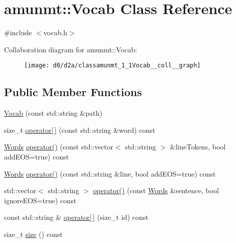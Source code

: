 \hypertarget{classamunmt_1_1Vocab}{}\section{amunmt\+:\+:Vocab Class Reference}
\label{classamunmt_1_1Vocab}


{\ttfamily \#include $<$vocab.\+h$>$}



Collaboration diagram for amunmt\+:\+:Vocab\+:
\nopagebreak
\begin{figure}[H]
\begin{center}
\leavevmode
\texttt{[image: d0/d2a/classamunmt\_1\_1Vocab\_\_coll\_\_graph]}
\end{center}
\end{figure}
\subsection*{Public Member Functions}
\begin{DoxyCompactItemize}
\item 
\hyperlink{classamunmt_1_1Vocab_afba1a9cfd5441b9a4455bb69cc656e93}{Vocab} (const std\+::string \&path)
\item 
size\+\_\+t \hyperlink{classamunmt_1_1Vocab_a18466782bbc9fd453034fa5a58e72be9}{operator\mbox{[}$\,$\mbox{]}} (const std\+::string \&word) const 
\item 
\hyperlink{namespaceamunmt_aa50d0b3a5ba58ba5da8a4d88ddab1b18}{Words} \hyperlink{classamunmt_1_1Vocab_a0e6c0ff224b78f0e99b184c9d9432d11}{operator()} (const std\+::vector$<$ std\+::string $>$ \&line\+Tokens, bool add\+E\+OS=true) const 
\item 
\hyperlink{namespaceamunmt_aa50d0b3a5ba58ba5da8a4d88ddab1b18}{Words} \hyperlink{classamunmt_1_1Vocab_a557548134490b9904832cddecae4c55d}{operator()} (const std\+::string \&line, bool add\+E\+OS=true) const 
\item 
std\+::vector$<$ std\+::string $>$ \hyperlink{classamunmt_1_1Vocab_ad04a5e797a3e47de9a14a5246eb813db}{operator()} (const \hyperlink{namespaceamunmt_aa50d0b3a5ba58ba5da8a4d88ddab1b18}{Words} \&sentence, bool ignore\+E\+OS=true) const 
\item 
const std\+::string \& \hyperlink{classamunmt_1_1Vocab_abeae26d24cc48fba79af12a0bdfd5f0b}{operator\mbox{[}$\,$\mbox{]}} (size\+\_\+t id) const 
\item 
size\+\_\+t \hyperlink{classamunmt_1_1Vocab_ae48b739add0c08cb29aeef394641dd4b}{size} () const 
\end{DoxyCompactItemize}
